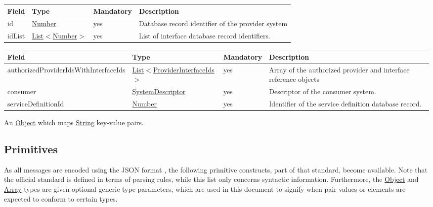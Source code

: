 \documentclass[a4paper]{arrowhead}
\newcommand{\pref}[1]{{\textcolor{ArrowheadGrey}{\hyperref[sec:model:primitives:#1]{#1}}}}
\begin{document}
\label{sec:model:ProviderInterfaceIds}

\begin{table}[ht!]
\begin{tabularx}{\textwidth}{| p{3cm} | p{3cm} | p{2cm} | X |} \hline
\rowcolor{gray!33} Field & Type & Mandatory & Description \\ \hline
id & \pref{Number} & yes & Database record identifier of the provider system \\ \hline
idList & \pref{List}$<$\pref{Number}$>$ & yes & List of interface database record identifiers. \\ \hline
\end{tabularx}
\end{table}

\clearpage

\label{sec:model:CheckAuthRuleResponse}
 
\begin{table}[ht!]
\begin{tabularx}{\textwidth}{| p{6cm} | p{4cm} | p{2cm} | X |} \hline
\rowcolor{gray!33} Field & Type & Mandatory & Description \\ \hline
authorizedProviderIdsWithInterfaceIds & \pref{List}$<$\hyperref[sec:model:ProviderInterfaceIds]{ProviderInterfaceIds}$>$ & yes & Array of the authorized provider and interface reference objects \\ \hline
consumer & \hyperref[sec:model:SystemDescriptor]{SystemDescriptor} & yes & Descriptor of the consumer system. \\ \hline
serviceDefinitionId &\pref{Number} & yes & Identifier of the service definition database record. \\ \hline
\end{tabularx}
\end{table}

\label{sec:model:Metadata}

An \pref{Object} which maps \pref{String} key-value pairs.

\newpage

\subsection{Primitives}
\label{sec:model:primitives}

As all messages are encoded using the JSON format \cite{bray2014json}, the following primitive constructs, part of that standard, become available.
Note that the official standard is defined in terms of parsing rules, while this list only concerns syntactic information.
Furthermore, the \pref{Object} and \pref{Array} types are given optional generic type parameters, which are used in this document to signify when pair values or elements are expected to conform to certain types. 
\end{document}
